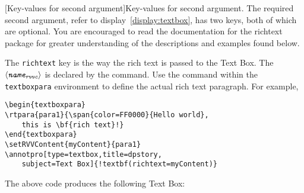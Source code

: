 \documentclass[12pt]{article}
\makeatletter
\def\pkg{\textsf}
\let\opt\texttt
\let\uif\textsf
\let\env\texttt
\def\ameta#1{$\langle\textit{\texttt{#1}}\rangle$}
\def\SUB#1{\ensuremath{{}_{\text{#1}}}}
\renewenvironment{quote}[1][]
   {\def\@rgi{#1}\ifx\@rgi\@empty
    \let\rghtm\@empty\else\def\rghtm{\rightmargin\leftmargin}\fi
    \list{}{\rghtm} %
    \item\relax}
   {\endlist}
\renewcommand*{\theparagraph}{\texorpdfstring{\protect\P\protect\ }{\textparagraph}}
\renewcommand{\paragraph}
    {\renewcommand{\@seccntformat}[1]{\theparagraph}%
    \@startsection{paragraph}{4}{0pt}{6pt}{-3pt}{\color{\aeb@subsubsectioncolor}\bfseries}}
\def\chgCurrLblName#1{\def\@currentlabelname{#1}}
\makeatother
\begin{document}
\paragraph[Key-values for second argument]{Key-values for second argument.}\chgCurrLblName{Key-values for second argument}\label{para:KV2ndArg}
The required second argument, refer to display~\eqref{display:textbox}, has
two keys, both of which are optional. You are encouraged to read the
documentation for the \pkg{richtext} package for greater understanding of the
descriptions and examples found below.
\begin{description}
    \item[\texttt{richtext=\ameta{name\SUB{rvvc}}}] The \opt{richtext} key
        is the way the rich text is passed to the \uif{Text Box}. The
        \ameta{name\SUB{rvvc}} is declared by the 
        command. Use the command  within the \env{textboxpara}
        environment to define the actual rich text paragraph. For example,
\begin{Verbatim}[fontsize=\small,commandchars=!()]
\begin{textboxpara}
\rtpara{para1}{\span{color=FF0000}{Hello world},
    this is \bf{rich text}!}
\end{textboxpara}
\setRVVContent{myContent}{para1}
\annotpro[type=textbox,title=dpstory,
    subject=Text Box]{!textbf(richtext=myContent)}
\end{Verbatim}
The above code produces the following \uif{Text Box}:
\begin{quote}
\begin{textboxpara}
\end{textboxpara}
\end{quote}


\end{description}
\end{document}
